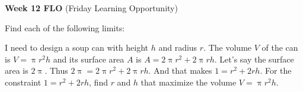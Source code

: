 \documentclass[10pt,fleqn]{exam}
\begin{document}
\vspace{0.1in}

\noindent \textbf{Week 12 FLO} (Friday Learning Opportunity) 

\begin{questions}  
    
 \question Find each of the following limits:
 
  
 
  \question I need to design a soup can with height $h$ and radius $r$. The volume $V$ of the can is
  $V = \uppi r^2 h$ and its surface area $A$ is $A = 2 \uppi r^2 + 2 \uppi r h$. Let's say the surface
  area is $2 \uppi$. Thus $2 \uppi = 2 \uppi r^2 + 2 \uppi r h$. And that makes $1 =  r^2 + 2 r h$.
  For the constraint  $1 =  r^2 + 2 r h$, find $r$ and $h$ that maximize the volume $V = \uppi r^2 h$.
 
 
 
 
 
 \end{questions}
 
\end{document}
